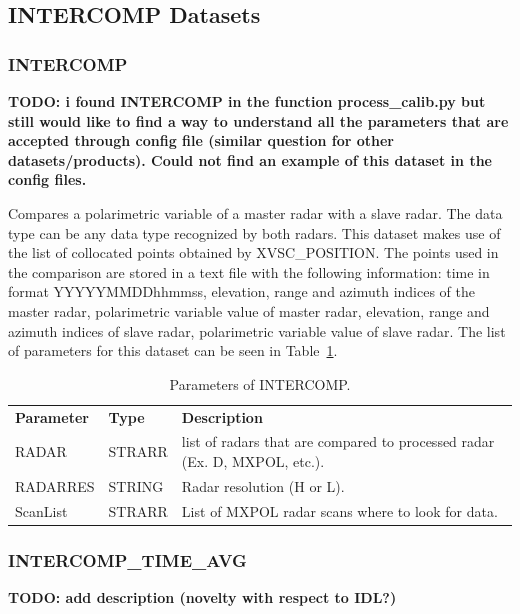 \documentclass[a4paper,11pt,pdftex,twoside]{scrartcl}
\renewcommand{\bf}{\normalfont \bfseries}
\begin{document}
{{{\subsection{INTERCOMP Datasets}

\subsubsection{INTERCOMP}
\label{subsec_intercomp}

{\bf TODO: i found INTERCOMP in the function process\_calib.py but still would like to find a way to understand all the parameters that are accepted through config file (similar question for other datasets/products). Could not find an example of this dataset in the config files. }


Compares a polarimetric variable of a master radar with a slave radar. The data type can be any data type recognized by both radars. This dataset makes use of the list of collocated points obtained by XVSC\_POSITION. The points used in the comparison are stored in a text file with the following information: time in format YYYYYMMDDhhmmss, elevation, range and azimuth indices of the master radar, polarimetric variable value of master radar, elevation, range and azimuth indices of slave radar, polarimetric variable value of slave radar. The list of parameters for this dataset can be seen in Table~\ref{tab_dataset_intercomp}.

\begin{table}[H]
\begin{tabularx}{\textwidth}{llX}
\bf{Parameter}  & \bf{Type}  & \bf{Description}\\
RADAR         & STRARR     & list of radars that are compared to processed radar (Ex. D, MXPOL, etc.).\\
RADARRES & STRING & Radar resolution (H or L).\\
ScanList & STRARR & List of MXPOL radar scans where to look for data.\\
\end{tabularx}
\caption{Parameters of INTERCOMP.}
\label{tab_dataset_intercomp}
\end{table}

\subsubsection{INTERCOMP\_TIME\_AVG}
\label{subsec_intercomp_time_avg}

{\bf TODO: add description (novelty with respect to IDL?)}


}}}
\end{document}

